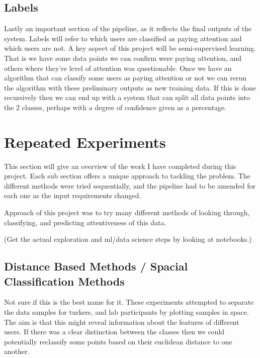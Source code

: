 \documentclass{article}
\begin{document}
\subsection{Labels}


Lastly an important section of the pipeline, as it reflects the final outputs of the system.
Labels will refer to which users are classified as paying attention and which users are not.
A key aspect of this project will be semi-supervised learning.
That is we have some data points we can confirm were paying attention, and others where they're level of attention was questionable.
Once we have an algorithm that can classify some users as paying attention or not we can rerun the algorithm with these preliminary outputs as new training data.
If this is done recursively then we can end up with a system that can split all data points into the 2 classes, perhaps with a degree of confidence given as a percentage.


\section{Repeated Experiments}

This section will give an overview of the work I have completed during this project.
Each sub section offers a unique approach to tackling the problem.
The different methods were tried sequentially, and the pipeline had to be amended for each one as the input requirements changed.

Approach of this project was to try many different methods of looking through, classifying, and predicting attentiveness of this data.

(Get the actual exploration and ml/data science steps by looking at notebooks.)

\subsection{Distance Based Methods / Spacial Classification Methods}

Not sure if this is the best name for it.
These experiments attempted to separate the data samples for turkers, and lab participants by plotting samples in space.
The aim is that this might reveal information about the features of different users.
If there was a clear distinction between the classes then we could potentially reclassify some points based on their euclidean distance to one another.
\end{document}
